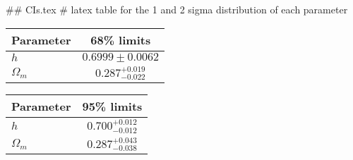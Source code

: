 ## CIs.tex
# latex table for the 1 and 2 sigma distribution of each parameter

\begin{tabular} { l  c}
 Parameter &  68\% limits\\
\hline
{\boldmath$h              $} & $0.6999\pm 0.0062          $\\
{\boldmath$\Omega_m       $} & $0.287^{+0.019}_{-0.022}   $\\
\hline
\end{tabular}

\begin{tabular} { l  c}
 Parameter &  95\% limits\\
\hline
{\boldmath$h              $} & $0.700^{+0.012}_{-0.012}   $\\
{\boldmath$\Omega_m       $} & $0.287^{+0.043}_{-0.038}   $\\
\hline
\end{tabular}
